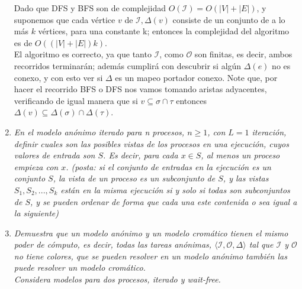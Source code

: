 \documentclass{article}
\begin{document}
\begin{enumerate}
{    Dado que DFS y BFS son de complejidad $O(\mathcal{I}) = O(|V| + |E|)$, y suponemos que cada vértice $v$ de $\mathcal{I},\Delta(v)$
    consiste de un conjunto de a lo más $k$ vértices, para una constante k; entonces la complejidad del algoritmo es de
    $O((|V| + |E|) k)$.\\
    El algoritmo es correcto, ya que tanto $\mathcal{I}$, como $\mathcal{O}$ son finitas, es decir, ambos recorridos terminarán; además
    cumplirá con descubrir si algún $\Delta(e)$ no es conexo, y con esto ver si $\Delta$ es un mapeo portador conexo. Note que, por
    hacer el recorrido BFS o DFS nos vamos tomando aristas adyacentes, verificando de igual manera que si $v\subseteq\sigma\cap\tau$ entonces
    $\Delta(v)\subseteq\Delta(\sigma)\cap\Delta(\tau)$.
  }

\item {
    \textsl{
      En el modelo anónimo iterado para n procesos, $n ≥ 1$, con $L = 1$ iteración, definir
      cuales son las posibles vistas de los procesos en una ejecución, cuyos valores de entrada
      son $S$. Es decir, para cada $x \in S$, al menos un proceso empieza con $x$. (posta: si el
      conjunto de entradas en la ejecución es un conjunto $S$, la vista de un proceso es un 
      subconjunto de $S$, y las vistas $S_1,S_2,...,S_k$ están en la misma ejecución si y solo si
      todas son subconjuntos de $S$, y se pueden ordenar de forma que cada una este contenida o
      sea igual a la siguiente)
    }
  }
  
\item{
    \textsl{
      Demuestra que un modelo anónimo y un modelo cromático tienen el mismo poder de cómputo, es
      decir, todas las tareas anónimas, $\langle \mathcal{I},\mathcal{O},\Delta \rangle$ tal que
      $\mathcal{I}$ y $\mathcal{O}$ no tiene colores, que se pueden resolver en un modelo anónimo
      también las puede resolver un modelo cromático.\\
      Considera modelos para dos procesos, iterado y wait-free.\\
    }

}
\end{enumerate}
\end{document}

